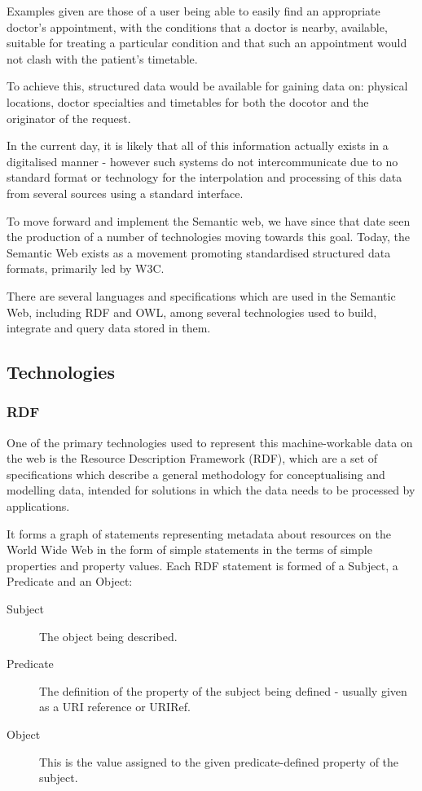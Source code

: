 \documentclass{article}
\begin{document}
Examples given are those of a user being able to easily find an appropriate
doctor's appointment, with the conditions that a doctor is nearby, available, 
suitable for treating a particular condition and that such an appointment would
not clash with the patient's timetable.

To achieve this, structured data would be available for gaining data on:
physical locations, doctor specialties and timetables for both the docotor and
the originator of the request. 

In the current day, it is likely that all of this information actually exists in
a digitalised manner - however such systems do not intercommunicate due to no
standard format or technology for the interpolation and processing of this data
from several sources using a standard interface.

To move forward and implement the Semantic web, we have since that date seen the
production of a number of technologies moving towards this goal. Today, the
Semantic Web exists as a movement promoting standardised structured data
formats, primarily led by W3C.

There are several languages and specifications which are used in the Semantic
Web, including RDF and OWL, among several technologies used to build, integrate
and query data stored in them.

\subsection{Technologies}

\subsubsection{RDF}

One of the primary technologies used to represent this machine-workable data on
the web is the Resource Description Framework (RDF), which are a set of
specifications which describe a general methodology for conceptualising and
modelling data, intended for solutions in which the data needs to be processed
by applications.

It forms a graph of statements representing metadata about resources on the
World Wide Web in the form of simple statements in the terms of simple
properties and property values. Each RDF statement is formed of a Subject, a
Predicate and an Object:

\begin{description}
    \item[Subject] The object being described.
    \item[Predicate] The definition of the property of the subject being
    defined - usually given as a URI reference or URIRef.
    \item[Object] This is the value assigned to the given
    predicate-defined property of the subject.
\end{description}
\end{document}
